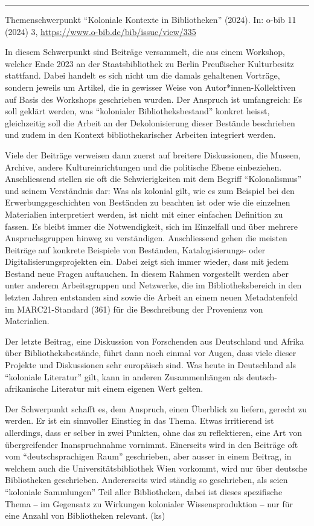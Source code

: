 \documentclass[a4paper,
fontsize=11pt,
oneside,
numbers=noperiodatend,
parskip=half-,
bibliography=totoc,
final
]{scrartcl}
\begin{document}
\begin{center}\rule{0.5\linewidth}{0.5pt}\end{center}

Themenschwerpunkt \enquote{Koloniale Kontexte in Bibliotheken} (2024).
In: o-bib 11 (2024) 3, \url{https://www.o-bib.de/bib/issue/view/335}

In diesem Schwerpunkt sind Beiträge versammelt, die aus einem Workshop,
welcher Ende 2023 an der Staatsbibliothek zu Berlin Preußischer
Kulturbesitz stattfand. Dabei handelt es sich nicht um die damals
gehaltenen Vorträge, sondern jeweils um Artikel, die in gewisser Weise
von Autor*innen-Kollektiven auf Basis des Workshops geschrieben wurden.
Der Anspruch ist umfangreich: Es soll geklärt werden, was
\enquote{kolonialer Bibliotheksbestand} konkret heisst, gleichzeitig
soll die Arbeit an der Dekolonisierung dieser Bestände beschrieben und
zudem in den Kontext bibliothekarischer Arbeiten integriert werden.

Viele der Beiträge verweisen dann zuerst auf breitere Diskussionen, die
Museen, Archive, andere Kultureinrichtungen und die politische Ebene
einbeziehen. Anschliessend stellen sie oft die Schwierigkeiten mit dem
Begriff \enquote{Kolonalismus} und seinem Verständnis dar: Was als
kolonial gilt, wie es zum Beispiel bei den Erwerbungsgeschichten von
Beständen zu beachten ist oder wie die einzelnen Materialien
interpretiert werden, ist nicht mit einer einfachen Definition zu
fassen. Es bleibt immer die Notwendigkeit, sich im Einzelfall und über
mehrere Anspruchsgruppen hinweg zu verständigen. Anschliessend gehen die
meisten Beiträge auf konkrete Beispiele von Beständen, Katalogisierungs-
oder Digitalisierungsprojekten ein. Dabei zeigt sich immer wieder, dass
mit jedem Bestand neue Fragen auftauchen. In diesem Rahmen vorgestellt
werden aber unter anderem Arbeitsgruppen und Netzwerke, die im
Bibliotheksbereich in den letzten Jahren entstanden sind sowie die
Arbeit an einem neuen Metadatenfeld im MARC21-Standard (361) für die
Beschreibung der Provenienz von Materialien.

Der letzte Beitrag, eine Diskussion von Forschenden aus Deutschland und
Afrika über Bibliotheksbestände, führt dann noch einmal vor Augen, dass
viele dieser Projekte und Diskussionen sehr europäisch sind. Was heute
in Deutschland als \enquote{koloniale Literatur} gilt, kann in anderen
Zusammenhängen als deutsch-afrikanische Literatur mit einem eigenen Wert
gelten.

Der Schwerpunkt schafft es, dem Anspruch, einen Überblick zu liefern,
gerecht zu werden. Er ist ein sinnvoller Einstieg in das Thema. Etwas
irritierend ist allerdings, dass er selber in zwei Punkten, ohne das zu
reflektieren, eine Art von übergreifender Inanspruchnahme vornimmt.
Einerseits wird in den Beiträge oft vom \enquote{deutschsprachigen Raum}
geschrieben, aber ausser in einem Beitrag, in welchem auch die
Universitätsbibliothek Wien vorkommt, wird nur über deutsche
Bibliotheken geschrieben. Andererseits wird ständig so geschrieben, als
seien \enquote{koloniale Sammlungen} Teil aller Bibliotheken, dabei ist
dieses spezifische Thema ‒ im Gegensatz zu Wirkungen kolonialer
Wissensproduktion ‒ nur für eine Anzahl von Bibliotheken relevant. (ks)
\end{document}
